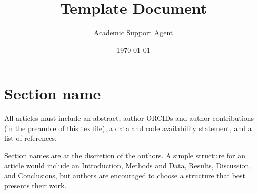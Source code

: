 \documentclass{article}
\title{Template Document}
\author{Academic Support Agent}
\date{\today}
\begin{document}
\maketitle

	
	
	\section{Section name}
	
	All articles must include an abstract, author ORCIDs and author contributions (in the preamble of this tex file), a data and code availability statement, and a list of references. 
	
	Section names are at the discretion of the authors. A simple structure for an article would include an Introduction, Methods and Data, Results, Discussion, and Conclusions, but authors are encouraged to choose a structure that best presents their work.
	
\end{document}

